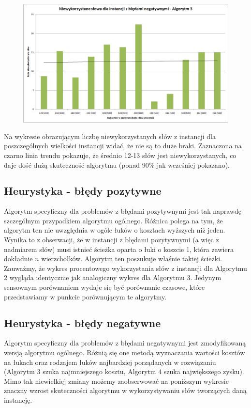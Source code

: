 \documentclass[a4paper,10pt]{article}
\begin{document}
\begin{figure}[h]
  \footnotesize\centering
  \includegraphics[width=\textwidth,keepaspectratio]{unusedWords_general_negative.png}
\end{figure}

Na wykresie obrazującym liczbę niewykorzystanych słów z instancji dla poszczególnych wielkości instancji widać, że nie są to duże braki. Zaznaczona na czarno linia trendu pokazuje, że średnio 12-13 słów jest niewykorzystanych, co daje dość dużą skuteczność algorytmu (ponad 90\% jak wcześniej pokazano).

\subsection{Heurystyka - błędy pozytywne}

Algorytm specyficzny dla problemów z błędami pozytywnymi jest tak naprawdę szczególnym przypadkiem algorytmu ogólnego. Różnica polega na tym, że algorytm ten nie uwzględnia w ogóle łuków o kosztach wyższych niż jeden. Wynika to z obserwacji, że w instancji z błędami pozytywnymi (a więc z nadmiarem słów) musi istnieć ścieżka oparta o łuki o koszcie 1, która zawiera dokładnie $n$ wierzchołków. Algorytm ten poszukuje właśnie takiej ścieżki. Zauważmy, że wykres procentowego wykorzystania słów z instancji dla Algorytmu 2 wygląda identycznie jak analogiczny wykres dla Algorytmu 3. Jedynym sensownym porównaniem wydaje się być porównanie czasowe, które przedstawiamy w punkcie porównującym te algorytmy.

\subsection{Heurystyka - błędy negatywne}

Algorytm specyficzny dla problemów z błędami negatywnymi jest zmodyfikowaną wersją algorytmu ogólnego. Różnią się one metodą wyznaczania wartości kosztów na łukach oraz rodzajem łuków najbardziej porządanych w rozwiązaniu (Algorytm 3 szuka najmniejszego kosztu, Algorytm 4 szuka największego zysku). Mimo tak niewielkiej zmiany możemy zaobserwować na poniższym wykresie znaczny wzrost skuteczności algorytmu w wykorzystywaniu słów tworzących daną instancję.
\end{document}
